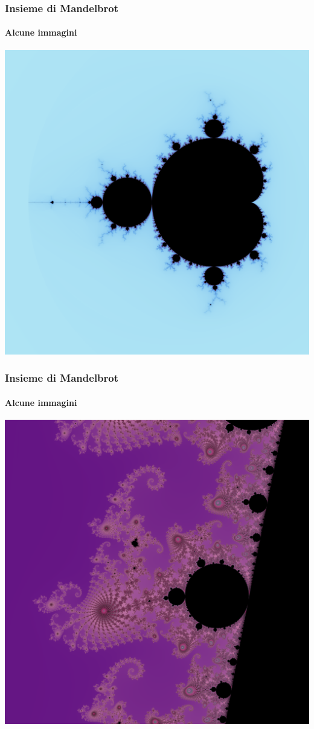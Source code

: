 \documentclass{beamer}
\begin{document}
			\begin{frame}
				\frametitle{Insieme di Mandelbrot}
				\framesubtitle{Alcune immagini}
				\begin{center}
					\includegraphics[width=0.7\linewidth]{"../Insieme di Mandelbrot/z1"}
				\end{center}
			\end{frame}
			\begin{frame}
				\frametitle{Insieme di Mandelbrot}
				\framesubtitle{Alcune immagini}
				\begin{center}
					\includegraphics[width=0.7\linewidth]{"../Insieme di Mandelbrot/z2"}
				\end{center}
			\end{frame}
\end{document}
